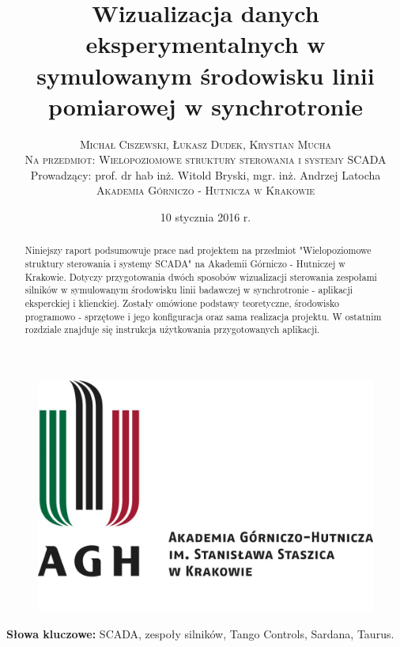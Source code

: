\documentclass[twoside]{article}
\title{\vspace{-15mm}\fontsize{24pt}{10pt}\selectfont\textbf{Wizualizacja danych eksperymentalnych w symulowanym środowisku linii pomiarowej w synchrotronie}} %
\author{
\large
\textsc{Michał Ciszewski, Łukasz Dudek, Krystian Mucha}\\[3mm] %
\textsc{Na przedmiot: Wielopoziomowe struktury sterowania i systemy SCADA}\\[3mm] %
\normalsize Prowadzący: prof. dr hab inż. Witold Bryski, mgr. inż. Andrzej Latocha\\[9mm]
\textsc{Akademia Górniczo - Hutnicza w Krakowie} %
}
\date{10 stycznia 2016 r.}
\begin{document}
	
\begin{figure}
	\centering
	\includegraphics[width=0.9\linewidth]{Grafika/agh_logo}
	\label{fig:agh-logo}
\end{figure}

\maketitle %

\thispagestyle{fancy} %

\clearpage


\vspace{10mm}
\begin{abstract}

\noindent Niniejszy raport podsumowuje prace nad projektem na przedmiot "Wielopoziomowe struktury sterowania i systemy SCADA" na Akademii Górniczo - Hutniczej w Krakowie. Dotyczy przygotowania dwóch sposobów wizualizacji sterowania zespołami silników w symulowanym środowisku linii badawczej w synchrotronie - aplikacji eksperckiej i klienckiej. Zostały omówione podstawy teoretyczne, środowisko programowo - sprzętowe i jego konfiguracja oraz sama realizacja projektu. W ostatnim rozdziale znajduje się instrukcja użytkowania przygotowanych aplikacji.

\end{abstract}

\smallskip
\noindent \textbf{Słowa kluczowe:} SCADA, zespoły silników, Tango Controls, Sardana, Taurus.
\end{document}
